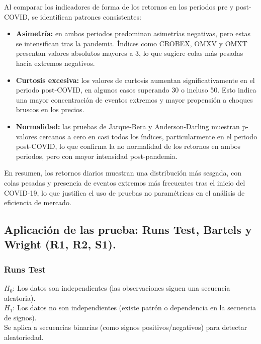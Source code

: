 \documentclass[12pt]{article}
\begin{document}
Al comparar los indicadores de forma de los retornos en los periodos pre y post-COVID, se identifican patrones consistentes:

\begin{itemize}
    \item \textbf{Asimetría:} en ambos periodos predominan asimetrías negativas, pero estas se intensifican tras la pandemia. Índices como CROBEX, OMXV y OMXT presentan valores absolutos mayores a 3, lo que sugiere colas más pesadas hacia extremos negativos.
    
    \item \textbf{Curtosis excesiva:} los valores de curtosis aumentan significativamente en el periodo post-COVID, en algunos casos superando 30 o incluso 50. Esto indica una mayor concentración de eventos extremos y mayor propensión a choques bruscos en los precios.
    
    \item \textbf{Normalidad:} las pruebas de Jarque-Bera y Anderson-Darling muestran p-valores cercanos a cero en casi todos los índices, particularmente en el periodo post-COVID, lo que confirma la no normalidad de los retornos en ambos periodos, pero con mayor intensidad post-pandemia.
\end{itemize}

En resumen, los retornos diarios muestran una distribución más sesgada, con colas pesadas y presencia de eventos extremos más frecuentes tras el inicio del COVID-19, lo que justifica el uso de pruebas no paramétricas en el análisis de eficiencia de mercado.


\subsection {Aplicación de las prueba: Runs Test, Bartels y Wright (R1, R2, S1).}

\subsubsection{\large Runs Test}

$H_0$: Los datos son independientes (las observaciones siguen una secuencia aleatoria).\\
$H_1$: Los datos no son independientes (existe patrón o dependencia en la secuencia de signos).\\

Se aplica a secuencias binarias (como signos positivos/negativos) para detectar aleatoriedad.
\end{document}
